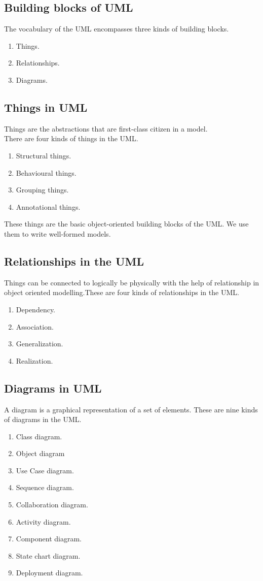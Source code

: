 \subsection{Building blocks of UML}
The vocabulary of the UML encompasses three kinds of building blocks.
\begin{enumerate}
	\item Things.
	\item Relationships.
	\item Diagrams.
\end{enumerate}
\subsection{Things in UML}
Things are the abstractions that are first-class citizen in a model.\\
There are four kinds of things in the UML.
\begin{enumerate}
	\item Structural things.
	\item Behavioural things.
	\item Grouping things.
	\item Annotational things.
\end{enumerate}
These things are the basic object-oriented building blocks of the UML. We use them to write well-formed models.
\subsection{Relationships in the UML}
Things can be connected to logically be physically with the help of relationship in object oriented modelling.These are four kinds of relationships in the UML.

\begin{enumerate}
	\item Dependency.
	\item Association.
	\item Generalization.
	\item Realization.
\end{enumerate}
\subsection{Diagrams in UML}
A diagram is a graphical representation of a set of elements. These are nine kinds of diagrams in the UML.
\begin{enumerate}
	\item Class diagram.                 
\item  Object diagram                
\item  Use Case diagram.               
\item  Sequence diagram.             
\item  Collaboration diagram.
\item  Activity diagram.
\item  Component diagram.
\item  State chart diagram.
\item  Deployment diagram.

\end{enumerate}
